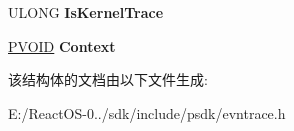 \begin{DoxyCompactItemize}
\begin{tabbing}
\end{tabbing}\item 
\mbox{\label{struct___e_v_e_n_t___t_r_a_c_e___l_o_g_f_i_l_e_w_a14fcd182283bde406df7b52426f2d8f9}} 
U\+L\+O\+NG {\bfseries Is\+Kernel\+Trace}
\item 
\mbox{\label{struct___e_v_e_n_t___t_r_a_c_e___l_o_g_f_i_l_e_w_a8ed71770f819d555b31b7ff3532195cd}} 
\hyperlink{interfacevoid}{P\+V\+O\+ID} {\bfseries Context}
\end{DoxyCompactItemize}


该结构体的文档由以下文件生成\+:\begin{DoxyCompactItemize}
\item 
E\+:/\+React\+O\+S-\/0../sdk/include/psdk/evntrace.\+h\end{DoxyCompactItemize}
